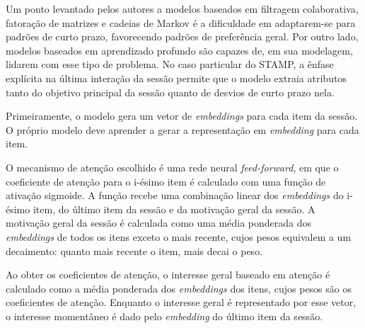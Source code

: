 Um ponto levantado pelos autores a modelos baseados em filtragem colaborativa,
fatoração de matrizes e cadeias de Markov é a dificuldade em adaptarem-se para
padrões de curto prazo, favorecendo padrões de preferência geral. Por outro
lado, modelos baseados em aprendizado profundo são capazes de, em sua modelagem,
lidarem com esse tipo de problema. No caso particular do STAMP, a ênfase
explícita na última interação da sessão permite que o modelo extraia atributos
tanto do objetivo principal da sessão quanto de desvios de curto prazo nela.

Primeiramente, o modelo gera um vetor de \textit{embeddings} para cada item da
sessão. O próprio modelo deve aprender a gerar a representação em
\textit{embedding} para cada item.

O mecanismo de atenção escolhido é uma rede neural \textit{feed-forward}, em que
o coeficiente de atenção para o i-ésimo item é calculado com uma função de
ativação sigmoide. A função recebe uma combinação linear dos \textit{embeddings} do
i-ésimo item, do último item da sessão e da motivação geral da sessão. A
motivação geral da sessão é calculada como uma média ponderada dos
\textit{embeddings} de todos os itens exceto o mais recente, cujos pesos
equivalem a um decaimento: quanto mais recente o item, mais decai o peso.

Ao obter os coeficientes de atenção, o interesse geral baseado em atenção é
calculado como a média ponderada dos \textit{embeddings} dos itens, cujos pesos
são os coeficientes de atenção. Enquanto o interesse geral é representado por
esse vetor, o interesse momentâneo é dado pelo \textit{embedding} do último item
da sessão. 


